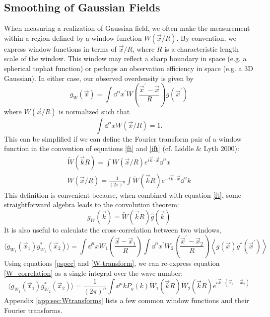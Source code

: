 \subsection{Smoothing of Gaussian Fields}
\label{smoothing}
When measuring a realization of Gaussian field, we often make the measurement
within a region defined by a window function $W(\vec x/R)$.
By convention, we express window functions in terms of $\vec x/R$,
where $R$ is a characteristic length scale of the window.
This window may reflect a sharp boundary in space (e.g. a spherical tophat 
function) or perhaps an observation efficiency in space (e.g. a 3D Gaussian).
In either case, our observed overdensity is given by
\begin{equation}
  g_W(\vec x) = \int \dd^n x^\prime 
  W\left(\frac{\vec{x}^\prime-\vec{x}}{R}\right) g(\vec{x}^\prime)
\end{equation}
where $W(\vec x/R)$ is normalized such that
\begin{equation}
  \label{W_normalization}
  \int \dd^nx W(\vec{x}/R) = 1.
\end{equation}
This can be simplified if we can define the Fourier transform pair 
of a window function in the convention
of equations \ref{ft} and \ref{ift} (cf. Liddle \& Lyth 2000):
\begin{eqnarray}
  \label{W-transform}
  \widetilde{W}(\vec{k}R) = \int W(\vec{x}/R) e^{i\vec{k}\cdot\vec{x}}\dd^nx 
  \nonumber\\
  W(\vec{x}/R) = \frac{1}{(2\pi)^n}\int 
  \widetilde{W}(\vec{k}R) e^{-i\vec{k}\cdot\vec{x}}\dd^nk 
\end{eqnarray}
This definition is convenient because, when combined with equation \ref{ft},
some straightforward algebra leads to the convolution theorem:
\begin{equation}
  \hat g_W(\vec k) = \widetilde W(\vec k R)\hat g(\vec k)
\end{equation}
It is also useful to calculate the cross-correlation between two windows,
\begin{equation}
  \label{W_correlation}
  \langle g_{W_1}(\vec x_1)g^*_{W_2}(\vec x_2)\rangle = 
  \int \dd^n x 
  W_1\left(\frac{\vec{x}-\vec{x}_1}{R}\right) 
  \int \dd^n x^\prime 
  W_2\left(\frac{\vec{x}^\prime-\vec{x}_2}{R}\right) 
  \left\langle g(\vec{x})g^*(\vec{x}^\prime)  \right\rangle
\end{equation}
Using equations \ref{pspec} and \ref{W-transform}, we can re-express
equation \ref{W_correlation} as a single integral over the
wave number:
\begin{equation}
  \label{W_cov_simp}
  \langle g_{W_1}(\vec x_1)g^*_{W_2}(\vec x_2)\rangle = 
  \frac{1}{(2\pi)^n} \int \dd^nk
  P_g(k)\widetilde{W}_1(\vec{k}R)\widetilde{W}_2(\vec{k}R)
  e^{i\vec k\cdot(\vec x_1-\vec x_2)}
\end{equation}
Appendix \ref{app:sec:Wtransforms} lists a few common window functions and
their Fourier transforms.


